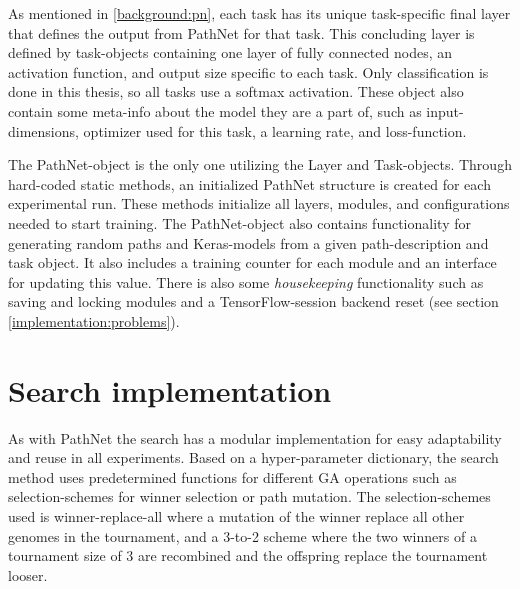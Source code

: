 As mentioned in \ref{background:pn}, each task has its unique task-specific final layer that defines the output from PathNet for that task. This concluding layer is defined by task-objects containing one layer of fully connected nodes, an activation function, and output size specific to each task. Only classification is done in this thesis, so all tasks use a softmax activation. These object also contain some meta-info about the model they are a part of, such as input-dimensions, optimizer used for this task, a learning rate, and loss-function. 

The PathNet-object is the only one utilizing the Layer and Task-objects. Through hard-coded static methods, an initialized PathNet structure is created for each experimental run. These methods initialize all layers, modules, and configurations needed to start training. The PathNet-object also contains functionality for generating random paths and Keras-models from a given path-description and task object. It also includes a training counter for each module and an interface for updating this value. There is also some \textit{housekeeping} functionality such as saving and locking modules and a TensorFlow-session backend reset (see section \ref{implementation:problems}).

\section{Search implementation}
\label{implementation.search}
As with PathNet the search has a modular implementation for easy adaptability and reuse in all experiments. Based on a hyper-parameter dictionary, the search method uses predetermined functions for different GA operations such as selection-schemes for winner selection or path mutation. The selection-schemes used is winner-replace-all where a mutation of the winner replace all other genomes in the tournament, and a 3-to-2 scheme where the two winners of a tournament size of 3 are recombined and the offspring replace the tournament looser.

